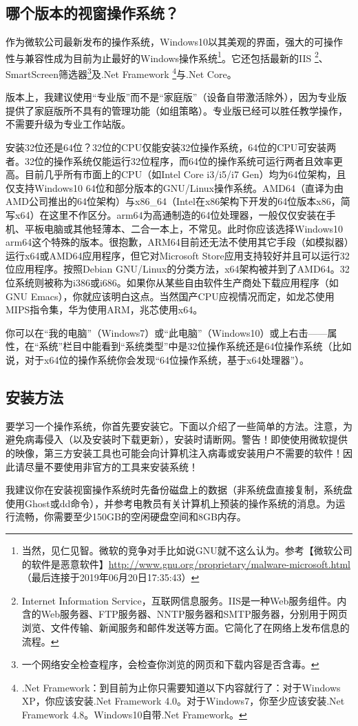 \subsection{哪个版本的视窗操作系统？}
作为微软公司最新发布的操作系统，Windows10以其美观的界面，强大的可操作性与兼容性成为目前为止最好的Windows操作系统\footnote{当然，见仁见智。微软的竞争对手比如说GNU就不这么认为。参考【微软公司的软件是恶意软件】\url{http://www.gnu.org/proprietary/malware-microsoft.html}（最后连接于2019年06月20日17:35:43）}。它还包括最新的IIS \footnote{Internet Information Service，互联网信息服务。IIS是一种Web服务组件。内含的Web服务器、FTP服务器、NNTP服务器和SMTP服务器，分别用于网页浏览、文件传输、新闻服务和邮件发送等方面。它简化了在网络上发布信息的流程。\cite{iisinfo}}、SmartScreen筛选器\footnote{一个网络安全检查程序，会检查你浏览的网页和下载内容是否含毒。}及.Net Framework \footnote{.Net Framework：到目前为止你只需要知道以下内容就行了：对于Windows XP，你应该安装.Net Framework 4.0。对于Windows7，你至少应该安装.Net Framework 4.8。Windows10自带.Net Framework。}与.Net Core。\par 
版本上，我建议使用“专业版”而不是“家庭版”（设备自带激活除外），因为专业版提供了家庭版所不具有的管理功能（如组策略）。专业版已经可以胜任教学操作，不需要升级为专业工作站版。\par
安装32位还是64位？32位的CPU仅能安装32位操作系统，64位的CPU可安装两者。32位的操作系统仅能运行32位程序，而64位的操作系统可运行两者且效率更高。目前几乎所有市面上的CPU（如Intel Core i3/i5/i7  Gen）均为64位架构，且仅支持Windows10 64位和部分版本的GNU/Linux操作系统。AMD64（直译为由AMD公司推出的64位架构）与x86\_64（Intel在x86架构下开发的64位版本x86，简写x64）在这里不作区分。arm64为高通制造的64位处理器，一般仅仅安装在手机、平板电脑或其他轻薄本、二合一本上，不常见。此时你应该选择Windows10 arm64这个特殊的版本。很抱歉，ARM64目前还无法不使用其它手段（如模拟器）运行x64或AMD64应用程序，但它对Microsoft Store应用支持较好并且可以运行32位应用程序。按照Debian GNU/Linux的分类方法，x64架构被并到了AMD64。32位系统则被称为i386或i686。如果你从某些自由软件生产商处下载应用程序（如GNU Emacs），你就应该明白这点。当然国产CPU应视情况而定，如龙芯使用MIPS指令集，华为使用ARM，兆芯使用x64。\par
你可以在“我的电脑”（Windows7）或“此电脑”（Windows10）或上右击——属性，在“系统”栏目中能看到“系统类型”中是32位操作系统还是64位操作系统（比如说，对于x64位的操作系统你会发现“64位操作系统，基于x64处理器”）。
\subsection{安装方法}
要学习一个操作系统，你首先要安装它。下面以介绍了一些简单的方法。注意，为避免病毒侵入（以及安装时下载更新），安装时请断网。{\color{red}警告！即使使用微软提供的映像，第三方安装工具也可能会向计算机注入病毒或安装用户不需要的软件！因此请尽量不要使用非官方的工具来安装系统！}\par
我建议你在安装视窗操作系统时先备份磁盘上的数据（非系统盘直接复制，系统盘使用Ghost或dd命令），并参考电教员有关计算机上预装的操作系统的消息。为运行流畅，你需要至少150GB的空闲硬盘空间和8GB内存。

